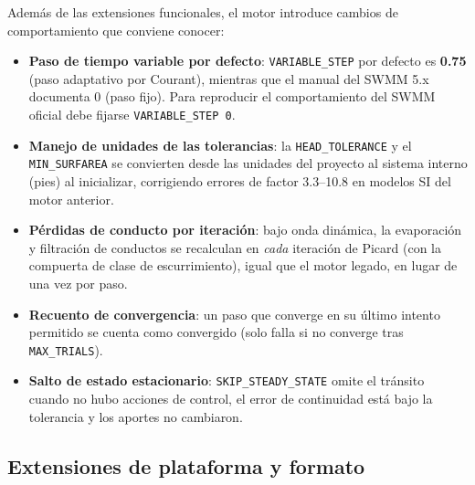 \documentclass[11pt,a4paper]{article}
\begin{document}
Además de las extensiones funcionales, el motor introduce cambios de
comportamiento que conviene conocer:

\begin{itemize}[nosep]
  \item \textbf{Paso de tiempo variable por defecto}: \texttt{VARIABLE\_STEP}
        por defecto es \textbf{0.75} (paso adaptativo por Courant), mientras
        que el manual del SWMM 5.x documenta 0 (paso fijo). Para reproducir el
        comportamiento del SWMM oficial debe fijarse \texttt{VARIABLE\_STEP 0}.
  \item \textbf{Manejo de unidades de las tolerancias}: la \texttt{HEAD\_TOLERANCE}
        y el \texttt{MIN\_SURFAREA} se convierten desde las unidades del
        proyecto al sistema interno (pies) al inicializar, corrigiendo errores
        de factor 3.3--10.8 en modelos SI del motor anterior.
  \item \textbf{Pérdidas de conducto por iteración}: bajo onda dinámica, la
        evaporación y filtración de conductos se recalculan en \emph{cada}
        iteración de Picard (con la compuerta de clase de escurrimiento),
        igual que el motor legado, en lugar de una vez por paso.
  \item \textbf{Recuento de convergencia}: un paso que converge en su último
        intento permitido se cuenta como convergido (solo falla si no converge
        tras \texttt{MAX\_TRIALS}).
  \item \textbf{Salto de estado estacionario}: \texttt{SKIP\_STEADY\_STATE}
        omite el tránsito cuando no hubo acciones de control, el error de
        continuidad está bajo la tolerancia y los aportes no cambiaron.
\end{itemize}

\subsection{Extensiones de plataforma y formato}
\end{document}
